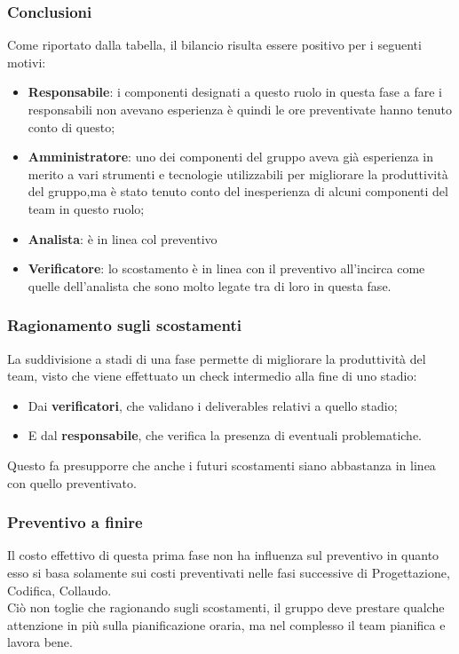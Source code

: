 \subsubsection{Conclusioni}
Come riportato dalla tabella, il bilancio risulta essere positivo per i seguenti motivi:
\begin{itemize}
	\item \textbf{Responsabile}: {i componenti designati a questo ruolo in questa fase a fare i responsabili non avevano esperienza è quindi le ore preventivate hanno tenuto conto di questo; }
	\item \textbf{Amministratore}: {uno dei componenti del gruppo aveva già esperienza in merito a vari strumenti e tecnologie utilizzabili per migliorare la produttività del gruppo,ma è stato tenuto 
	conto del inesperienza di alcuni componenti del team in questo ruolo;}
	\item \textbf{Analista}: {è in linea col preventivo}
	\item \textbf{Verificatore}: {lo scostamento è in linea con il preventivo all'incirca come quelle dell'analista che sono molto legate tra di loro in questa fase.}
\end{itemize}

\subsubsection{Ragionamento sugli scostamenti}
La suddivisione a stadi di una fase permette di migliorare la produttività del team, visto che viene effettuato un check intermedio alla fine di uno stadio:
\begin{itemize}
	\item Dai \textbf{verificatori}, che validano i deliverables relativi a quello stadio;
	\item E dal \textbf{responsabile}, che verifica la presenza di eventuali problematiche.
\end{itemize}
Questo fa presupporre che anche i futuri scostamenti siano abbastanza in linea con quello preventivato.
\subsubsection{Preventivo a finire}
Il costo effettivo di questa prima fase non ha influenza sul preventivo in quanto esso si basa solamente sui costi preventivati nelle fasi successive di Progettazione, Codifica, Collaudo.\\
Ciò non toglie che ragionando sugli scostamenti, il gruppo deve prestare qualche attenzione in più sulla pianificazione oraria, ma nel complesso il team pianifica e lavora bene.
